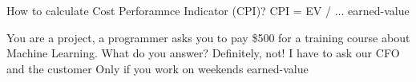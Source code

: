 \documentclass{article}
\begin{document}

\pmbaQuestion
  {How to calculate Cost Perforamnce Indicator (CPI)?}
  {CPI = EV / ...}
  {}
  {}
  {}
  {earned-value}

\pmbaQuestion
  {You are a project, a programmer asks you to pay \$500 for a training course about Machine Learning. What do you answer?}
  {Definitely, not!}
  {I have to ask our CFO and the customer}
  {Only if you work on weekends}
  {}
  {earned-value}


\end{document}
